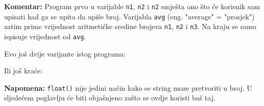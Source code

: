 	\textbf{Komentar:} Program prvo u varijable \verb+n1+, \verb+n2+ i \verb+n2+
	smješta ono što će korisnik sam upisati kad ga se upita da upiše broj.
	Varijabla \verb"avg" (eng. "average" = "prosjek") zatim prime vrijednost
	aritmetičke sredine brojeva 
	\verb"n1",
	\verb"n2" i 
	\verb"n3".
	Na kraju se samo ispisuje vrijednost od \verb"avg".

	Evo još dvije varijante istog programa:


	Ili još kraće:


	\textbf{Napomena:} \verb+float()+ nije jedini način kako se string moze
	pretvoriti u broj. U sljedećem poglavlju će biti objašnjeno zašto se
	ovdje koristi baš taj.

